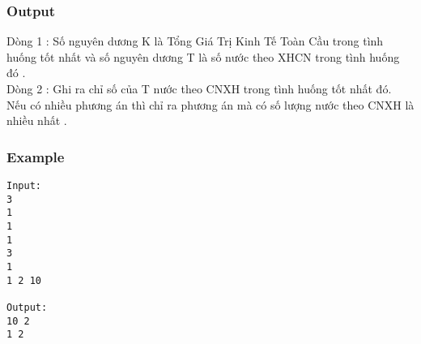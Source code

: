 \subsubsection{   Output  }

   Dòng 1 : Số nguyên dương K là Tổng Giá Trị Kinh Tế Toàn Cầu trong tình huống tốt nhất và số nguyên dương T là số nước theo XHCN trong tình huống đó .   
\\   Dòng 2 : Ghi ra chỉ số của T nước theo CNXH trong tình huống tốt nhất đó. Nếu có nhiều phương án thì chỉ ra phương án mà có số lượng nước theo CNXH là nhiều nhất .  

\subsubsection{   Example  }
\begin{verbatim}
Input:
3
1
1
1
3
1
1 2 10

Output:
10 2
1 2

\end{verbatim}